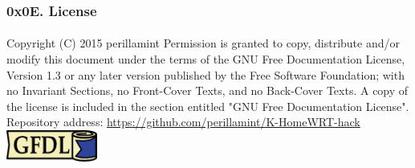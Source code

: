 \documentclass {beamer}
\begin{document}
\begin{frame}
  \frametitle{0x0E. License}
  \framesubtitle{}
  Copyright (C)  2015 perillamint\linebreak
  Permission is granted to copy, distribute and/or modify this document
  under the terms of the GNU Free Documentation License, Version 1.3
  or any later version published by the Free Software Foundation;\linebreak
  with no Invariant Sections, no Front-Cover Texts, and no Back-Cover Texts.
  A copy of the license is included in the section entitled "GNU
  Free Documentation License".
  \linebreak
  \linebreak
  Repository address:\linebreak
  \url{https://github.com/perillamint/K-HomeWRT-hack}
  \linebreak
  \linebreak
  \includegraphics [width=30mm]{img/gfdl-logo-small.png}
\end{frame}
\end{document}
